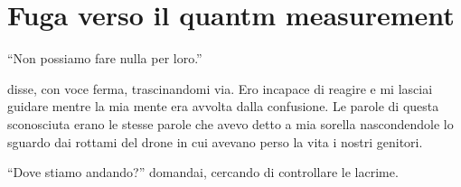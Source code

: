 \section{Fuga verso il quantm measurement}
\begin{center}
\begin{minipage}{0.7\textwidth}
    \centering
\end{minipage}
\end{center}

\begin{dialogue}
 \enquote{Non possiamo fare nulla per loro.}
\end{dialogue}
 disse,  con voce ferma, trascinandomi via. Ero incapace di reagire e mi lasciai guidare mentre  la mia mente era avvolta dalla confusione. Le parole di questa sconosciuta erano le stesse parole che avevo detto a mia sorella nascondendole lo sguardo dai rottami del drone in cui avevano perso la vita i nostri genitori.
\begin{dialogue}
 ``Dove stiamo andando?'' domandai, cercando di controllare le lacrime.
\end{dialogue}
 
